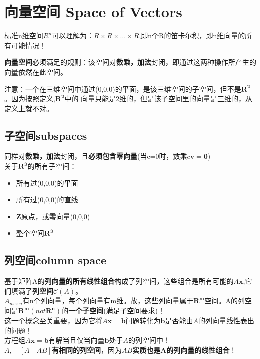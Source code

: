     \section{向量空间 Space of Vectors}
    标准n维空间$R^n$可以理解为：$R \times R \times \dots \times R$,即n个R的笛卡尔积，即n维向量的所有可能情况！

    \textbf{向量空间}必须满足的规则：该空间对\textbf{数乘，加法}封闭，即通过这两种操作所产生的向量依然在此空间。

    注意：一个在三维空间中通过(0,0,0)的平面，是该三维空间的子空间，但不是$\bm{R^2}$。因为按照定义,$\bm{R^2}$中的
    向量只能是2维的，但是该子空间里的向量是三维的，从定义上就不对。

    \subsection{子空间subspaces}
    同样对\textbf{数乘，加法}封闭，且\textbf{必须包含零向量}(当c=0时，数乘$c \bm{v}=\bm{0}$)
    \\
    关于$\bm{R^3}$的所有子空间：
    \begin{itemize}
        \item 所有过(0,0,0)的平面
        \item 所有过(0,0,0)的直线
        \item $\bm{Z}$原点，或零向量(0,0,0)
        \item 整个空间$\bm{R^3}$
    \end{itemize}
    \subsection{列空间column space}
    基于矩阵A的\textbf{列向量的所有线性组合}构成了列空间，这些组合是所有可能的$A\bm{x}$,它们填满了\textbf{列空间}$\bm{\mathcal{C}}(A)$。
    \\
    $A_{m\times n}$有n个列向量，每个列向量有m维。故，这些列向量属于$\bm{R^m}$空间。A的列空间是$\bm{R^m}(not \bm{R^n})$的\textbf{一个子空间}(满足子空间要求)！
    \\
    这一个概念至关重要，因为它\underline{将$A\bm{x}=\bm{b}$问题转化为$\bm{b}$是否能由$A$的列向量线性表出的问题}！
    \\
    方程组$A\bm{x}=\bm{b}$有解当且仅当向量$\bm{b}$处于$A$的列空间中！\\
    $A, \quad [A \quad AB]$\textbf{有相同的列空间}，因为$AB$\textbf{实质也是A的列向量的线性组合}！
    \\
